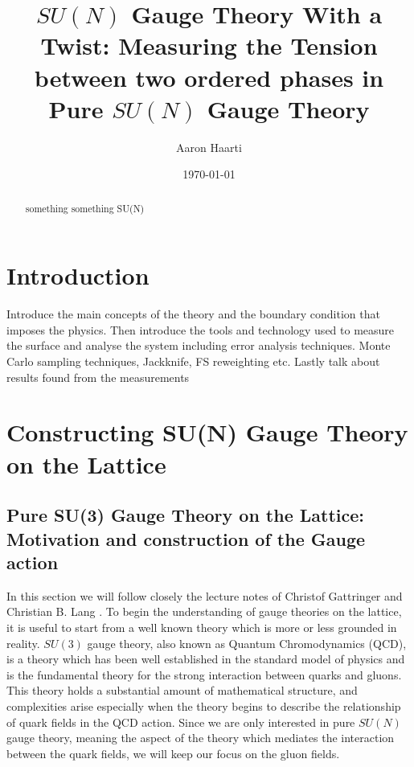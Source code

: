 \documentclass[english,twoside,openright]{UH_TCM_MSc}
\title{$SU(N)$ Gauge Theory With a Twist: Measuring the Tension between two ordered phases in Pure $SU(N)$ Gauge Theory}
\author{Aaron Haarti}
\date{\today}
\begin{document}
\maketitle


\begin{abstract}
something something SU(N)
\end{abstract}

\mytableofcontents

\mynomenclature

\chapter{Introduction}

Introduce the main concepts of the theory and the boundary condition that imposes the physics. Then introduce the tools and technology used to measure the surface and analyse the system including error analysis techniques. Monte Carlo sampling techniques, Jackknife, FS reweighting etc. Lastly talk about results found from the measurements

\chapter{Constructing SU(N) Gauge Theory on the Lattice} \label{ch:sun_gauge_theory}

\section{Pure SU(3) Gauge Theory on the Lattice: Motivation and construction of the Gauge action}

In this section we will follow closely the lecture notes of Christof Gattringer and Christian B. Lang \cite[ch.~2]{gattringer2009quantum}. To begin the understanding of gauge theories on the lattice, it is useful to start from a well known theory which is more or less grounded in reality. $SU(3)$ gauge theory, also known as Quantum Chromodynamics (QCD), is a theory which has been well established in the standard model of physics and is the fundamental theory for the strong interaction between quarks and gluons. This theory holds a substantial amount of mathematical structure, and complexities arise especially when the theory begins to describe the relationship of quark fields in the QCD action. Since we are only interested in pure $SU(N)$ gauge theory, meaning the aspect of the theory which mediates the interaction between the quark fields, we will keep our focus on the gluon fields.
\end{document}

